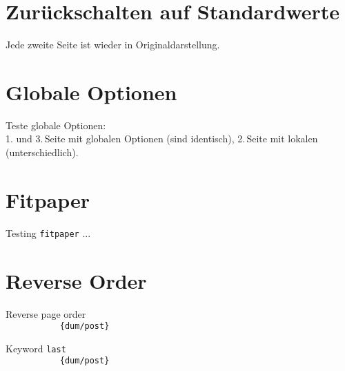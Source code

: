 \documentclass[a4paper,\myClassOptions]{article}
\begin{document}
\Huge




\begingroup
\section{Zur\"uckschalten auf Standardwerte}
Jede zweite Seite ist wieder in Originaldarstellung.











\endgroup

\begingroup
\section{Globale Optionen}
Teste globale Optionen:\\
1. und 3.\,Seite mit globalen Optionen (sind identisch),
2.\,Seite mit lokalen (unterschiedlich).




\endgroup


\section{Fitpaper}
\begingroup
Testing \texttt{fitpaper} ...

\endgroup


\section{Reverse Order}
\begingroup
Reverse page order\\
\verb||
\verb|           {dum/post}|

Keyword \verb|last|\\
\verb||
\verb|           {dum/post}|

\endgroup
\end{document}
